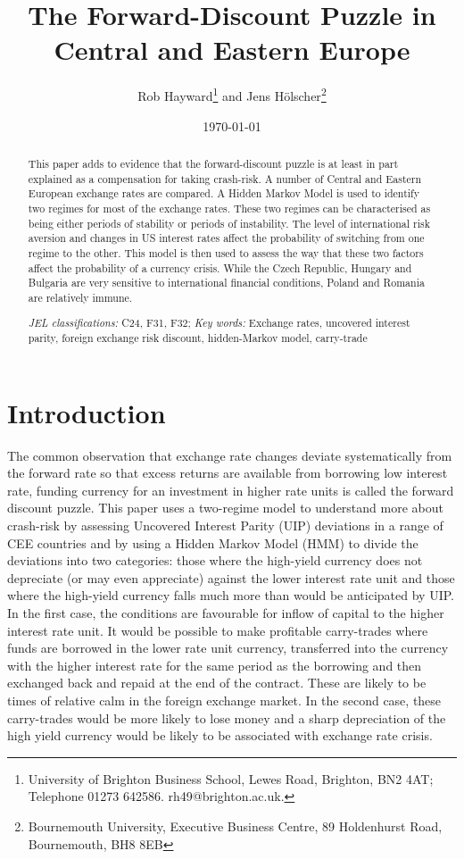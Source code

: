 \documentclass[12pt, a4paper, oneside]{article}\usepackage[]{graphicx}\usepackage[]{color}
\begin{document}
\title{The Forward-Discount Puzzle in Central and Eastern Europe}
\author{Rob Hayward\footnote{University of Brighton Business School, Lewes Road, Brighton, BN2 4AT; Telephone 01273 642586.  rh49@brighton.ac.uk.} and Jens H\"{o}lscher\footnote{Bournemouth University, Executive Business Centre, 89 Holdenhurst Road, Bournemouth, BH8 8EB}}  
\date{\today}
\maketitle
\begin{abstract}
This paper adds to evidence that the forward-discount puzzle is at least in part explained as a compensation for taking crash-risk. A number of Central and Eastern European exchange rates are compared. A Hidden Markov Model is used to identify two regimes for most of the exchange rates.  These two regimes can be characterised as being either periods of stability or periods of instability. The level of international risk aversion and changes in US interest rates affect the probability of switching from one regime to the other. This model is then used to assess the way that these two factors affect the probability of a currency crisis. While the Czech Republic,  Hungary and Bulgaria are very sensitive to international financial conditions, Poland and Romania are relatively immune.  

\emph{JEL classifications:} C24, F31, F32; 
\emph{Key words:} Exchange rates, uncovered interest parity, foreign exchange risk discount, hidden-Markov model, carry-trade


\end{abstract}

\section{Introduction}
The common observation that exchange rate changes deviate systematically from the forward rate so that excess returns are available from borrowing low interest rate, funding currency for an investment in higher rate units is called the forward discount puzzle.   This paper uses a two-regime model to understand more about crash-risk by assessing Uncovered Interest Parity (UIP) deviations in a range of CEE countries and by using a Hidden Markov Model (HMM) to divide the deviations into two categories: those where the high-yield currency does not depreciate (or may even appreciate) against the lower interest rate unit and those where the high-yield currency falls much more than would be anticipated by UIP.  In the first case, the conditions are favourable for inflow of capital to the higher interest rate unit.  It would be possible to make profitable carry-trades where funds are borrowed in the lower rate unit currency, transferred into the currency with the higher interest rate for the same period as the borrowing and then exchanged back and repaid at the end of the contract. These are likely to be times of relative calm in the foreign exchange market. In the second case, these carry-trades would be more likely to lose money and a sharp depreciation of the high yield currency would be likely to be associated with exchange rate crisis. 
\end{document}
